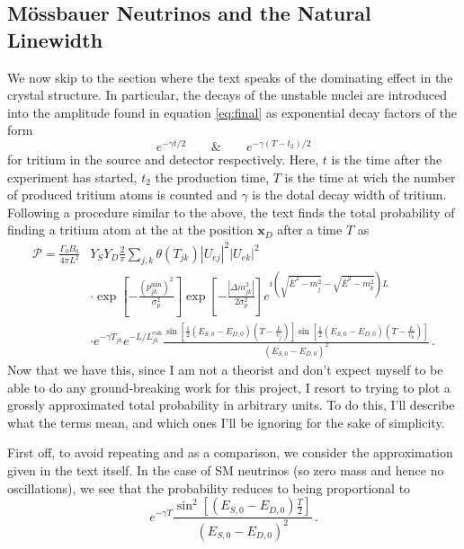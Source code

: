 \documentclass[10pt]{article}
\begin{document}
\subsection{M\"{o}ssbauer Neutrinos and the Natural Linewidth}

We now skip to the section where the text \cite{Akhmedov_2008} speaks of the dominating effect in the crystal structure. In particular, the decays of the unstable nuclei are introduced into the amplitude found in equation \ref{eq:final} as exponential decay factors of the form
\begin{equation}
  e^{-\gamma t/2} \hspace{2em} \& \hspace{2em} e^{-\gamma(T-t_{2})/2}
\end{equation}
for tritium in the source and detector respectively. Here, $t$ is the time after the experiment has started, $t_{2}$ the production time, $T$ is the time at wich the number of produced tritium atoms is counted and $\gamma$ is the dotal decay width of tritium. Following a procedure similar to the above, the text finds the total probability of finding a tritium atom at the at the position $\bm{x}_{D}$ after a time $T$ as
\begin{equation}\label{eq:prob_before}
  \begin{split}
    \mathcal{P} = \frac{\Gamma_{0}B_{0}}{4\pi L^{2}} & Y_{S}Y_{D}\frac{2}{\pi}\sum_{j,k}\theta(T_{jk})|U_{ej}|^{2}|U_{ek}|^{2} \\
    & \cdot \exp\left[-\frac{(p_{jk}^{\text{min}})^{2}}{\sigma_{p}^{2}}\right]\exp\left[-\frac{|\Delta m_{jk}^{2}|}{2\sigma^{2}_{p}}\right]e^{i\left(\sqrt{\bar{E}^{2} - m_{j}^{2}} - \sqrt{\bar{E}^{2} - m_{k}^{2}}\right)L} \\
    & \cdot e^{-\gamma T_{jk}}e^{-L/L_{jk}^{\text{coh}}}\frac{\sin\left[\frac{1}{2}(E_{S,0} - E_{D,0})(T - \frac{L}{v_{j}})\right]\sin\left[\frac{1}{2}(E_{S,0} - E_{D,0})(T - \frac{L}{v_{k}})\right]}{(E_{S,0} - E_{D,0})^{2}}\, .
  \end{split}
\end{equation}
Now that we have this, since I am not a theorist and don't expect myself to be able to do any ground-breaking work for this project, I resort to trying to plot a grossly approximated total probability in arbitrary units. To do this, I'll describe what the terms mean, and which ones I'll be ignoring for the sake of simplicity.

First off, to avoid repeating and as a comparison, we consider the approximation given in the text itself. In the case of SM neutrinos (so zero mass and hence no oscillations), we see that the probability reduces to being proportional to
\begin{equation}
  e^{-\gamma T}\frac{\sin^{2}[(E_{S,0} - E_{D,0})\frac{T}{2}]}{(E_{S,0} - E_{D,0})^{2}}\, .
\end{equation}
\end{document}
